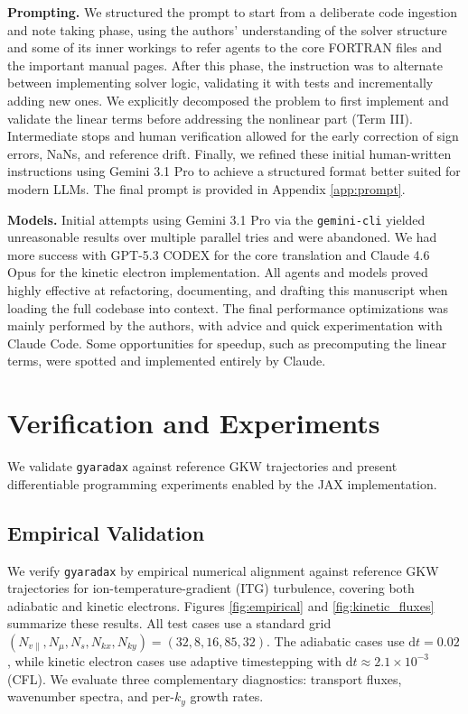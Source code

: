\documentclass{article}
\theoremstyle{plain}
\theoremstyle{definition}
\theoremstyle{remark}
\begin{document}
\textbf{Prompting.}
We structured the prompt to start from a deliberate code ingestion and note taking phase, using the authors'  understanding of the solver structure and some of its inner workings to refer agents to the core FORTRAN files and the important manual pages.
%
After this phase, the instruction was to alternate between implementing solver logic, validating it with tests and incrementally adding new ones.
%
We explicitly decomposed the problem to first implement and validate the linear terms before addressing the nonlinear part (Term III).
%
Intermediate stops and human verification allowed for the early correction of sign errors, NaNs, and reference drift. Finally, we refined these initial human-written instructions using Gemini 3.1 Pro to achieve a structured format better suited for modern LLMs. The final prompt is provided in Appendix \ref{app:prompt}.

\textbf{Models.}
Initial attempts using Gemini 3.1 Pro \cite{gemini31pro_2026} via the \texttt{gemini-cli} yielded unreasonable results over multiple parallel tries and were abandoned.
%
We had more success with GPT-5.3 CODEX \cite{openai_gpt53_codex_2026} for the core translation and Claude 4.6 Opus \cite{anthropic2026claude46opus} for the kinetic electron implementation.
All agents and models proved highly effective at refactoring, documenting, and drafting this manuscript when loading the full codebase into context.
%
The final performance optimizations was mainly performed by the authors, with advice and quick experimentation with Claude Code. Some opportunities for speedup, such as precomputing the linear terms, were spotted and implemented entirely by Claude.

\section{Verification and Experiments}

We validate \texttt{gyaradax} against reference GKW trajectories and present differentiable programming experiments enabled by the JAX implementation.


\subsection{Empirical Validation}
\label{sec:verification}
We verify \texttt{gyaradax} by empirical numerical alignment against reference GKW trajectories for ion-temperature-gradient (ITG) turbulence, covering both adiabatic \cite{paischer2025gyroswin} and kinetic electrons. Figures \ref{fig:empirical} and \ref{fig:kinetic_fluxes} summarize these results.
All test cases use a standard grid $(N_{v\parallel}, N_\mu, N_s, N_{kx}, N_{ky}) = (32, 8, 16, 85, 32)$.
The adiabatic cases use $\textrm{d}t = 0.02$, while kinetic electron cases use adaptive timestepping with $\textrm{d}t \approx 2.1 \times 10^{-3}$ (CFL).
We evaluate three complementary diagnostics: transport fluxes, wavenumber spectra, and per-$k_y$ growth rates.
\end{document}
